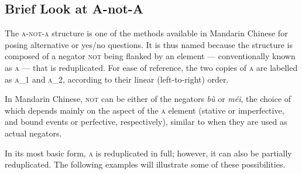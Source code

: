 \documentclass[12pt, UTF8]{article}
\begin{document}
\subsection{Brief Look at A-not-A}
The \textsc{a-not-a} structure is one of the methods available in Mandarin Chinese for posing alternative or yes/no questions. It is thus named because the structure is composed of a negator \textsc{not} being flanked by an element --- conventionally known as \textsc{a} --- that is reduplicated. For ease of reference, the two copies of \textsc{a} are labelled as \textsc{a_1} and \textsc{a_2}, according to their linear (left-to-right) order. 

In Mandarin Chinese, \textsc{not} can be either of the negators \textit{b\`{u}} or \textit{m\'{e}i}, the choice of which depends mainly on the aspect of the \textsc{a} element (stative or imperfective, and bound events or perfective, respectively), similar to when they are used as actual negators.\footnotemark[1] 

In its most basic form, \textsc{a} is reduplicated in full; however, it can also be partially reduplicated. The following examples will illustrate some of these possibilities.
\end{document}
